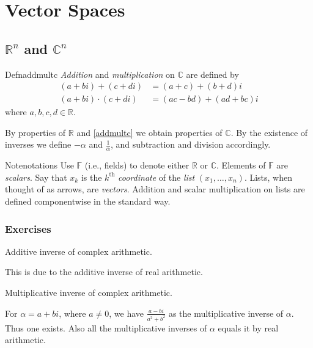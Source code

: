 \chapter{Vector Spaces}

\section{\texorpdfstring{$\mathbb R^n$ and $\mathbb C^n$}{Rn and Cn}}

\begin{reference}{Defn}{addmultc}
  \textit{Addition} and \textit{multiplication} on $\mathbb C$ are defined by
  \begin{align*}
    (a+bi)+(c+di)     & =(a+c)+(b+d)i     \\
    (a+bi)\cdot(c+di) & =(ac-bd)+(ad+bc)i
  \end{align*}
  where $a,b,c,d\in \mathbb R$.
\end{reference}

By properties of $\mathbb R$ and \ref{addmultc} we obtain properties of $\mathbb C$. By the existence of inverses we define $-\alpha$ and $\frac{1}{\alpha}$, and subtraction and division accordingly.

\begin{reference}{Note}{notations}
  Use $\mathbb F$ (i.e., fields) to denote either $\mathbb R$ or $\mathbb C$. Elements of $\mathbb F$ are \textit{scalars}. Say that $x_k$ is the $k^{\mathrm{th}}$ \textit{coordinate} of the \textit{list} $(x_1,\dots,x_n)$. Lists, when thought of as arrows, are \textit{vectors}. Addition and scalar multiplication on lists are defined componentwise in the standard way.
\end{reference}

\subsection*{Exercises}

\setcounter{exercise}{4}

\begin{exercise}
  Additive inverse of complex arithmetic.
\end{exercise}

This is due to the additive inverse of real arithmetic.

\begin{exercise}
  Multiplicative inverse of complex arithmetic.
\end{exercise}

For $\alpha=a+bi$, where $a\neq0$, we have $\frac{a-bi}{a^2+b^2}$ as the multiplicative inverse of $\alpha$. Thus one exists. Also all the multiplicative inverses of $\alpha$ equals it by real arithmetic.

